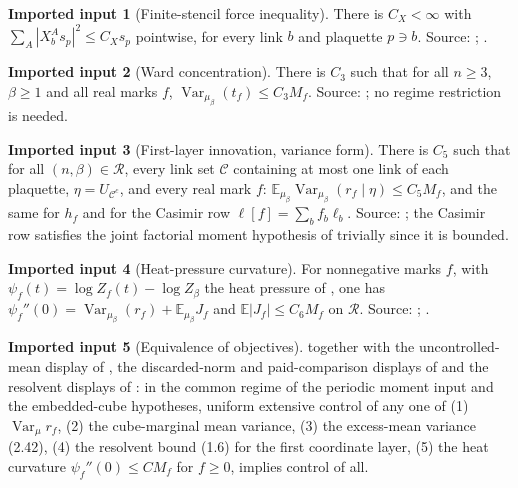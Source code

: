\documentclass[11pt]{article}
\theoremstyle{definition}
\newtheorem{hypothesis}{Imported input}
\newcommand{\E}{\mathbb{E}}
\newcommand{\Var}{\operatorname{Var}}
\begin{document}
\begin{hypothesis}[Finite-stencil force inequality]\label{I2}
There is $C_X<\infty$ with $\sum_A|X_b^As_p|^2\le C_Xs_p$ pointwise, for every link $b$ and plaquette $p\ni b$.
Source: \cite[after the moment display of the section]{cub}; \cite[proof of the directional-current Bernstein estimate]{dmn}.
\end{hypothesis}

\begin{hypothesis}[Ward concentration]\label{I3}
There is $C_3$ such that for all $n\ge3$, $\beta\ge1$ and all real marks $f$, $\Var_{\mu_\beta}(t_f)\le C_3M_f$.
Source: \cite[theorem on global concentration of the unchanged Ward difference]{wwa}; no regime restriction is needed.
\end{hypothesis}

\begin{hypothesis}[First-layer innovation, variance form]\label{I5}
There is $C_5$ such that for all $(n,\beta)\in\mathcal R$, every link set $\mathcal C$ containing at most one link of
each plaquette, $\eta=U_{\mathcal C^c}$, and every real mark $f$:
$\E_{\mu_\beta}\Var_{\mu_\beta}(r_f\mid\eta)\le C_5M_f$, and the same for $h_f$ and for the Casimir row
$\ell[f]=\sum_bf_b\ell_b$. Source: \cite[corollary on ordinary and physical innovations]{inn}; the Casimir row satisfies the
joint factorial moment hypothesis of \cite{inn} trivially since it is bounded.
\end{hypothesis}

\begin{hypothesis}[Heat-pressure curvature]\label{I6}
For nonnegative marks $f$, with $\psi_f(t)=\log Z_f(t)-\log Z_\beta$ the heat pressure of \cite[subsection ``The unchanged heat-pressure formulation'']{cur},
one has $\psi_f''(0)=\Var_{\mu_\beta}(r_f)+\E_{\mu_\beta}J_f$ and $\E|J_f|\le C_6M_f$ on $\mathcal R$.
Source: \cite[proposition on extensive actual-law acceleration and the heat-curvature identities]{whe}; \cite[heat-pressure display]{cur}.
\end{hypothesis}

\begin{hypothesis}[Equivalence of objectives]\label{I8}
\cite[proposition in subsection ``Equivalence of the remaining quantitative objectives'']{rsc} together with the
uncontrolled-mean display of \cite{cub}, the discarded-norm and paid-comparison displays of \cite{rsc} and the
resolvent displays of \cite{cur}: in the common
regime of the periodic moment input and the embedded-cube hypotheses, uniform extensive control of any one of
(1) $\Var_\mu r_f$, (2) the cube-marginal mean variance, (3) the excess-mean variance (2.42), (4) the resolvent bound
(1.6) for the first coordinate layer, (5) the heat curvature $\psi_f''(0)\le CM_f$ for $f\ge0$, implies control of all.
\end{hypothesis}
\end{document}
